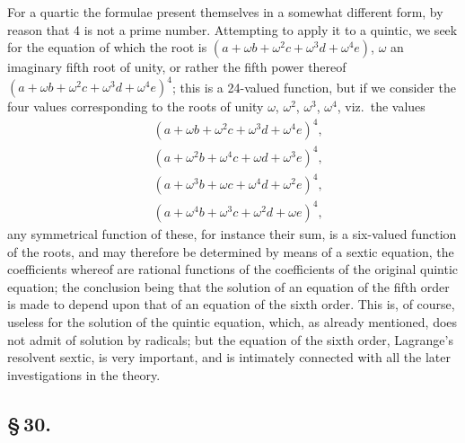 \documentclass[11pt,a4paper]{article}
\begin{document}
For a quartic the formulae present themselves in a somewhat different form, by reason that 4 is not a prime number. Attempting to apply it to a quintic, we seek for the equation of which the root is $(a + \omega b + \omega^{2}c + \omega^{3}d + \omega^{4}e)$, $\omega$ an imaginary fifth root of unity, or rather the fifth power thereof $(a + \omega b + \omega^{2}c + \omega^{3}d + \omega^{4}e)^{4}$; this is a 24-valued function, but if we consider the four values corresponding to the roots of unity $\omega$, $\omega^{2}$, $\omega^{3}$, $\omega^{4}$, viz.\ the values
\begin{align*}
&(a + \omega b + \omega^{2}c + \omega^{3}d + \omega^{4}e)^{4}, \\
&(a + \omega^{2}b + \omega^{4}c + \omega d + \omega^{3}e)^{4}, \\
&(a + \omega^{3}b + \omega c + \omega^{4}d + \omega^{2}e)^{4}, \\
&(a + \omega^{4}b + \omega^{3}c + \omega^{2}d + \omega e)^{4},
\end{align*}
any symmetrical function of these, for instance their sum, is a six-valued function of the roots, and may therefore be determined by means of a sextic equation, the coefficients whereof are rational functions of the coefficients of the original quintic equation; the conclusion being that the solution of an equation of the fifth order is made to depend upon that of an equation of the sixth order. This is, of course, useless for the solution of the quintic equation, which, as already mentioned, does not admit of solution by radicals; but the equation of the sixth order, Lagrange's resolvent sextic, is very important, and is intimately connected with all the later investigations in the theory.

\subsection*{\S\,30.}
\end{document}
